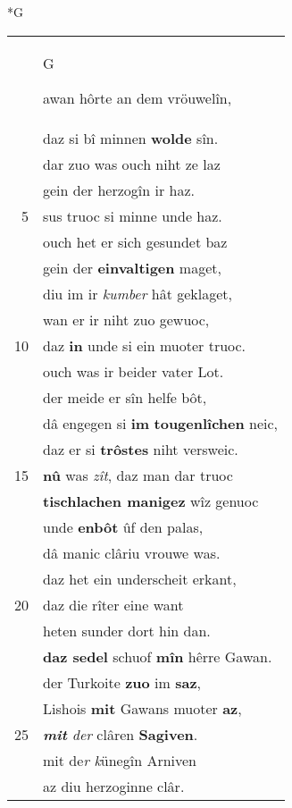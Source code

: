 \documentclass[8pt,a4paper,notitlepage]{article}
\begin{document}
\begin{table}[ht]
\begin{minipage}[t]{0.5\linewidth}
\small
\begin{center}*G
\end{center}
\begin{tabular}{rl}
 & \begin{large}G\end{large}awan hôrte an dem vröuwelîn,\\ 
 & daz si bî minnen \textbf{wolde} sîn.\\ 
 & dar zuo was ouch niht ze laz\\ 
 & gein der herzogîn ir haz.\\ 
5 & sus truoc si minne unde haz.\\ 
 & ouch het er sich gesundet baz\\ 
 & gein der \textbf{einvaltigen} maget,\\ 
 & diu im ir \textit{kumber} hât geklaget,\\ 
 & wan er ir niht zuo gewuoc,\\ 
10 & daz \textbf{in} unde si ein muoter truoc.\\ 
 & ouch was ir beider vater Lot.\\ 
 & der meide er sîn helfe bôt,\\ 
 & dâ engegen si \textbf{im} \textbf{tougenlîchen} neic,\\ 
 & daz er si \textbf{trôstes} niht versweic.\\ 
15 & \textbf{nû} was \textit{zît}, daz man dar truoc\\ 
 & \textbf{tischlachen manigez} wîz genuoc\\ 
 & unde \textbf{enbôt} ûf den palas,\\ 
 & dâ manic clâriu vrouwe was.\\ 
 & daz het ein underscheit erkant,\\ 
20 & daz die rîter eine want\\ 
 & heten sunder dort hin dan.\\ 
 & \textbf{daz sedel} schuof \textbf{mîn} hêrre Gawan.\\ 
 & der Turkoite \textbf{zuo} im \textbf{saz},\\ 
 & Lishois \textbf{mit} Gawans muoter \textbf{az},\\ 
25 & \textit{\textbf{mit} der} clâren \textbf{Sagiven}.\\ 
 & mit de\textit{r} \textit{k}ünegîn Arniven\\ 
 & az diu herzoginne clâr.\\ 

\end{tabular}
\end{minipage}
\end{table}
\end{document}
